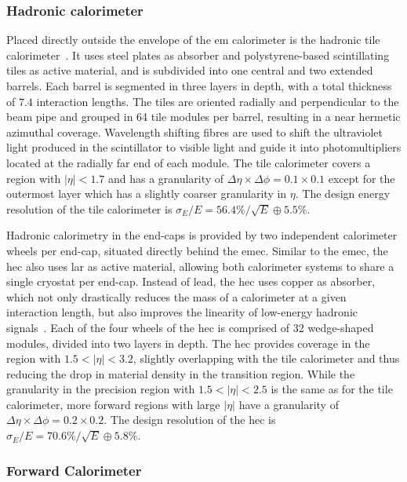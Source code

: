 \subsubsection{Hadronic calorimeter}

Placed directly outside the envelope of the \gls{em} calorimeter is the hadronic tile calorimeter~\cite{Aad:2008zzm}.
It uses steel plates as absorber and polystyrene-based scintillating tiles as active material, and is subdivided into one central and two extended barrels.
Each barrel is segmented in three layers in depth, with a total thickness of $7.4$ interaction lengths.
The tiles are oriented radially and perpendicular to the beam pipe and grouped in 64 tile modules per barrel, resulting in a near hermetic azimuthal coverage.
Wavelength shifting fibres are used to shift the ultraviolet light produced in the scintillator to visible light and guide it into photomultipliers located at the radially far end of each module.
The tile calorimeter covers a region with $\vert\eta\vert <1.7$ and has a granularity of $\Delta \eta \times \Delta \phi = 0.1 \times 0.1$ except for the outermost layer which has a slightly coarser granularity in $\eta$.
The design energy resolution of the tile calorimeter is $\sigma_E / E = 56.4\% / \sqrt{E} \oplus 5.5\%$.

Hadronic calorimetry in the end-caps is provided by two independent calorimeter wheels per end-cap, situated directly behind the \gls{emec}.
Similar to the \gls{emec}, the \gls{hec} also uses \gls{lar} as active material, allowing both calorimeter systems to share a single cryostat per end-cap.
Instead of lead, the \gls{hec} uses copper as absorber, which not only drastically reduces the mass of a calorimeter at a given interaction length, but also improves the linearity of low-energy hadronic signals~\cite{Lee:2637852}.
Each of the four wheels of the \gls{hec} is comprised of 32 wedge-shaped modules, divided into two layers in depth.
The \gls{hec} provides coverage in the region with $1.5 < \vert\eta\vert <3.2$, slightly overlapping with the tile calorimeter and thus reducing the drop in material density in the transition region.
While the granularity in the precision region with $1.5 < \vert\eta\vert <2.5$ is the same as for the tile calorimeter, more forward regions with large $\vert\eta\vert$ have a granularity of $\Delta \eta \times \Delta \phi = 0.2 \times 0.2$.
The design resolution of the \gls{hec} is $\sigma_E / E = 70.6\% / \sqrt{E} \oplus 5.8\%$.

\subsubsection{Forward Calorimeter}

